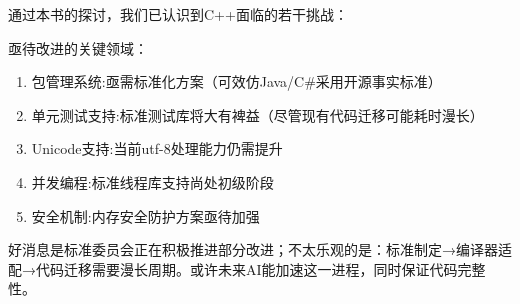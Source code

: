 通过本书的探讨，我们已认识到C++面临的若干挑战：

亟待改进的关键领域：

\begin{enumerate}
\item 
包管理系统:亟需标准化方案（可效仿Java/C\#采用开源事实标准）

\item 
单元测试支持:标准测试库将大有裨益（尽管现有代码迁移可能耗时漫长）

\item 
Unicode支持:当前utf-8处理能力仍需提升

\item 
并发编程:标准线程库支持尚处初级阶段

\item 
安全机制:内存安全防护方案亟待加强
\end{enumerate}

好消息是标准委员会正在积极推进部分改进；不太乐观的是：标准制定→编译器适配→代码迁移需要漫长周期。或许未来AI能加速这一进程，同时保证代码完整性。











